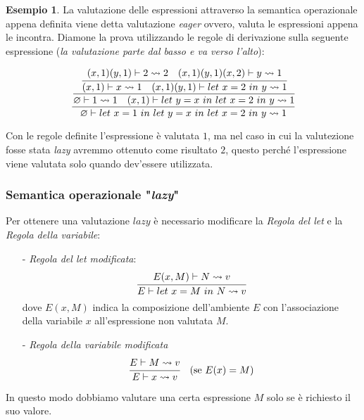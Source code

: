 \documentclass{article}
\theoremstyle{definition}
\theoremstyle{definition}
\theoremstyle{definition}
\newtheorem{example}[theorem]{Esempio}
\theoremstyle{remark}
\begin{document}
    \begin{example} La valutazione delle espressioni attraverso la semantica operazionale appena definita viene detta valutazione \textit{eager} ovvero, valuta le espressioni appena le incontra. Diamone la prova utilizzando le regole di derivazione sulla
        seguente espressione (\textit{la valutazione parte dal basso e va verso l'alto}):

        $$\cfrac{\cfrac{\cfrac{(x,1)(y,1)\vdash 2\leadsto 2 \quad (x,1)(y,1)(x,2)\vdash y\leadsto 1}{(x,1)\vdash x \leadsto 1 \quad (x,1)(y,1)\vdash\text{$let$ $x=2$ $in$ $y\leadsto 1$}}}{\varnothing \vdash 1\leadsto 1\quad (x,1)\vdash\text{$let$ $y=x$ $in$ $let$ $x=2$ $in$ $y\leadsto 1$}}}{\varnothing\vdash \text{$let$ $x=1$ $in$ $let$ $y=x$ $in$ $let$ $x=2$ $in$ $y\leadsto 1$}}$$

        Con le regole definite l'espressione è valutata $1$, ma nel caso in cui la valutezione fosse stata \textit{lazy} avremmo ottenuto come risultato $2$,
        questo perché l'espressione viene valutata solo quando dev'essere utilizzata.
    \end{example}
    \subsubsection{Semantica operazionale "\textit{\textbf{lazy}}"}
    Per ottenere una valutazione $lazy$ è necessario modificare la \textit{Regola del let} e la \textit{Regola della variabile}:
    \begin{itemize}
        \item [-] \textit{Regola del let modificata}: $$\cfrac{E(x,M)\vdash N \leadsto v}{E\vdash \text{$let$ $x=M$ $in$ $N\leadsto v$}}$$
              dove $E(x,M)$ indica la composizione dell'ambiente $E$ con l'associazione della variabile $x$ all'espressione non valutata $M$.
        \item [-] \textit{Regola della variabile modificata} $$\cfrac{E\vdash M\leadsto v}{E \vdash x \leadsto v}\quad (\text{se $E(x) = M$} )$$
    \end{itemize}
    In questo modo dobbiamo valutare una certa espressione $M$ solo se è richiesto il suo valore.
\end{document}
